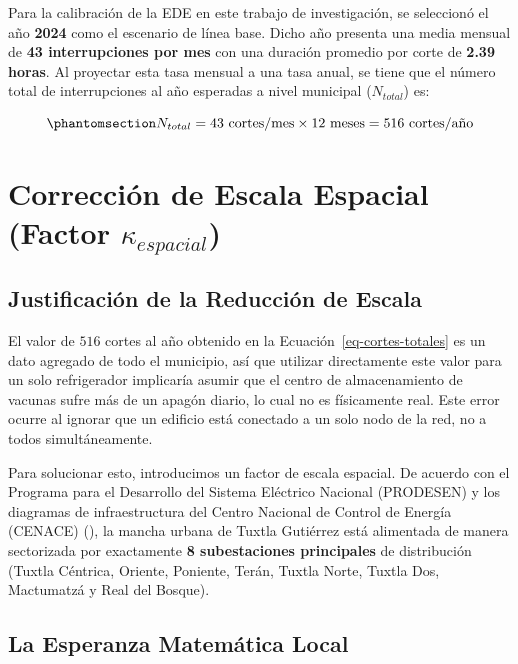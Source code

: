 \documentclass[
  spanish,
  letterpaper,
  DIV=11,
  numbers=noendperiod]{scrreprt}
\theoremstyle{plain}
\theoremstyle{plain}
\theoremstyle{plain}
\theoremstyle{definition}
\theoremstyle{remark}
\begin{document}
Para la calibración de la EDE en este trabajo de investigación, se
seleccionó el año \textbf{2024} como el escenario de línea base. Dicho
año presenta una media mensual de \textbf{43 interrupciones por mes} con
una duración promedio por corte de \textbf{2.39 horas}. Al proyectar
esta tasa mensual a una tasa anual, se tiene que el número total de
interrupciones al año esperadas a nivel municipal (\(N_{total}\)) es:

\begin{equation}\phantomsection\label{eq-cortes-totales}{
N_{total} = 43 \text{ cortes/mes} \times 12 \text{ meses} = 516 \text{ cortes/año}
}\end{equation}

\section{\texorpdfstring{Corrección de Escala Espacial (Factor
\(\kappa_{espacial}\))}{Corrección de Escala Espacial (Factor \textbackslash kappa\_\{espacial\})}}\label{sec-escala-espacial}

\subsection{Justificación de la Reducción de
Escala}\label{justificaciuxf3n-de-la-reducciuxf3n-de-escala}

El valor de \(516\) cortes al año obtenido en la
Ecuación~\ref{eq-cortes-totales} es un dato agregado de todo el
municipio, así que utilizar directamente este valor para un solo
refrigerador implicaría asumir que el centro de almacenamiento de
vacunas sufre más de un apagón diario, lo cual no es físicamente real.
Este error ocurre al ignorar que un edificio está conectado a un solo
nodo de la red, no a todos simultáneamente.

Para solucionar esto, introducimos un factor de escala espacial. De
acuerdo con el Programa para el Desarrollo del Sistema Eléctrico
Nacional (PRODESEN) y los diagramas de infraestructura del Centro
Nacional de Control de Energía (CENACE)
(), la
mancha urbana de Tuxtla Gutiérrez está alimentada de manera sectorizada
por exactamente \textbf{8 subestaciones principales} de distribución
(Tuxtla Céntrica, Oriente, Poniente, Terán, Tuxtla Norte, Tuxtla Dos,
Mactumatzá y Real del Bosque).

\subsection{La Esperanza Matemática
Local}\label{la-esperanza-matemuxe1tica-local}
\end{document}
